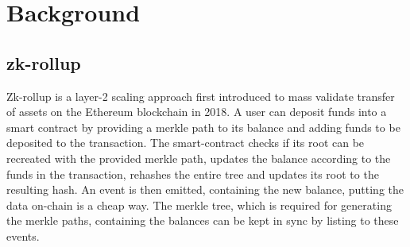 \documentclass[11pt,twoside,a4paper,final]{book}
\begin{document}
\section{Background}




\subsection{zk-rollup}
Zk-rollup \cite{vbuterin_2018} is a layer-2 scaling approach first introduced to mass validate transfer of assets on the Ethereum blockchain in 2018. A user can deposit funds into a smart contract by providing a merkle path to its balance and adding funds to be deposited to the transaction. The smart-contract checks if its root can be recreated with the provided merkle path, updates the balance according to the funds in the transaction, rehashes the entire tree and updates its root to the resulting hash. An event is then emitted, containing the new balance, putting the data on-chain is a cheap way. The merkle tree, which is required for generating the merkle paths, containing the balances can be kept in sync by listing to these events. 
\end{document}
